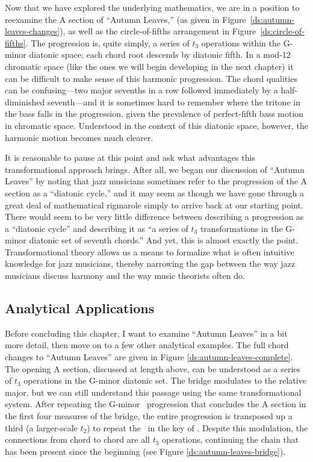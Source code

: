 Now that we have explored the underlying mathematics, we are in a position to
reexamine the A section of “Autumn Leaves,” (as given in
Figure~\ref{ds:autumn-leaves-changes}), as well as the circle-of-fifths
arrangement in Figure~\ref{ds:circle-of-fifths}. The progression is, quite
simply, a series of $t_3$ operations within the G-minor diatonic space; each
chord root descends by diatonic fifth. In a mod-12 chromatic space (like the
ones we will begin developing in the next chapter) it can be difficult to make
sense of this harmonic progression. The chord qualities can be confusing---two
major sevenths in a row followed immediately by a half-diminished
seventh---and it is sometimes hard to remember where the tritone in the bass
falls in the progression, given the prevalence of perfect-fifth bass motion in
chromatic space. Understood in the context of this diatonic space, however,
the harmonic motion becomes much clearer.

It is reasonable to pause at this point and ask what advantages this
transformational approach brings. After all, we began our discussion of
“Autumn Leaves” by noting that jazz musicians sometimes refer to the
progression of the A section as a “diatonic cycle,” and it may seem as though
we have gone through a great deal of mathematical rigmarole simply to arrive
back at our starting point. There would seem to be very little difference
between describing a progression as a “diatonic cycle” and describing it as “a
series of $t_3$ transformations in the G-minor diatonic set of seventh
chords.” And yet, this is almost exactly the point. Transformational theory
allows us a means to formalize what is often intuitive knowledge for jazz
musicians, thereby narrowing the gap between the way jazz musicians discuss
harmony and the way music theorists often do.



\subsection{Analytical Applications}
\label{subsec:analytical-applications} %
\FloatBarrier

Before concluding this chapter, I want to examine “Autumn Leaves” in a bit
more detail, then move on to a few other analytical examples. The full chord
changes to “Autumn Leaves” are given in Figure
\ref{ds:autumn-leaves-complete}. The opening A section, discussed at length
above, can be understood as a series of $t_3$ operations in the G-minor
diatonic set. The bridge modulates to the relative major, but we can still
understand this passage using the same transformational system. After
repeating the G-minor \tfo\ progression that concludes the A section in the
first four measures of the bridge, the entire progression is transposed up a
third (a larger-scale $t_2$) to repeat the \tfo\ in the key of \Bflat. Despite
this modulation, the connections from chord to chord are all $t_3$ operations,
continuing the chain that has been present since the beginning (see Figure
\ref{ds:autumn-leaves-bridge}).

